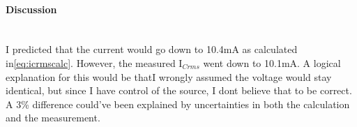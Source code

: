 \documentclass{report}
\begin{document}
\paragraph{Discussion}\mbox{}\\

I predicted that the current would go down to 10.4\si{\milli\ampere} as calculated in\eqref{eq:icrmscalc}. However, the measured I$_{Crms}$ went down to 10.1mA. A logical explanation for this would be thatI wrongly assumed the voltage would stay identical, but since I have control of the source, I dont believe that to be correct. A 3\% difference could've been explained by uncertainties in both the calculation and the measurement.
\end{document}
